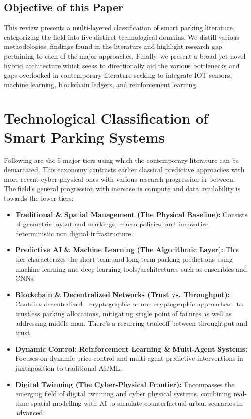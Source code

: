 \documentclass[conference]{IEEEtran}
\begin{document}
\subsection{Objective of this Paper}
This review presents a multi-layered classification of smart parking literature, categorizing the field into five distinct technological domains. We distill various methodologies, findings found in the literature and highlight research gap pertaining to each of the major approaches. Finally, we present a broad yet novel hybrid architecture which seeks to directionally aid the various bottlenecks and gaps overlooked in contemporary literature seeking to integrate IOT sensors, machine learning, blockchain ledgers, and reinforcement learning. 

\section{Technological Classification of Smart Parking Systems}
Following are the 5 major tiers using which the contemporary literature can be demarcated. This taxonomy contrasts earlier classical predictive approaches with more recent cyber-physical ones with various research progression in between. The field's general progression with increase in compute and data availability is towards the lower tiers:

\begin{itemize}
    \item \textbf{Traditional \& Spatial Management (The Physical Baseline):} Consists of geometric layout and markings, macro policies, and innovative deterministic non digital infrastructure.
    \item \textbf{Predictive AI \& Machine Learning (The Algorithmic Layer):} 
    This tier characterizes the short term and long term parking predictions using machine learning and deep learning tools/architectures such as ensembles and CNNs.
    \item \textbf{Blockchain \& Decentralized Networks (Trust vs. Throughput):} 
    Contains decentralized—cryptographic or non cryptographic approaches—to trustless parking allocations, mitigating single point of failures as well as addressing middle man. There's a recurring tradeoff between throughtput and trust.
    \item \textbf{Dynamic Control: Reinforcement Learning \& Multi-Agent Systems:}
    Focuses on dynamic price control and multi-agent predictive interventions in juxtaposition to traditional AI/ML.
    \item \textbf{Digital Twinning (The Cyber-Physical Frontier):} 
    Encompasses the emerging field of digital twinning and cyber physical systems, combining real-time spatial modelling with AI to simulate counterfactual urban scenarios in advanced.
\end{itemize}
\end{document}
